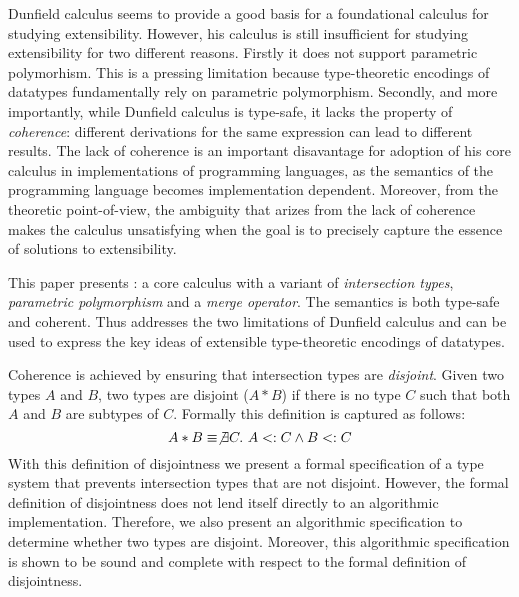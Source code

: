
Dunfield calculus seems to provide a good basis for a foundational
calculus for studying extensibility.  However, his calculus is still
insufficient for studying extensibility for two different reasons.  Firstly it does not
support parametric polymorhism. This is a pressing limitation because
type-theoretic encodings of datatypes fundamentally rely on parametric
polymorphism.  Secondly, and more importantly, while Dunfield calculus
is type-safe, it lacks the property of \emph{coherence}: different
derivations for the same expression can lead to different results. The
lack of coherence is an important disavantage for adoption of his core
calculus in implementations of programming languages, as the semantics
of the programming language becomes implementation dependent.
Moreover, from the theoretic point-of-view, the ambiguity that arizes
from the lack of coherence makes the calculus unsatisfying when the
goal is to precisely capture the essence of solutions to
extensibility.

This paper presents \name: a core calculus with a variant of
\emph{intersection types}, \emph{parametric polymorphism} and a
\emph{merge operator}. The semantics \name is both type-safe and
coherent. Thus \name addresses the two limitations of Dunfield
calculus and can be used to express the key ideas of extensible
type-theoretic encodings of datatypes.

Coherence is achieved by ensuring that intersection types are
\emph{disjoint}. Given two types $A$ and $B$, two types are disjoint
($A * B$)
if there is no type $C$ such that both $A$ and $B$ are
subtypes of $C$. Formally this definition is captured as follows:
\[A * B \equiv \not\exists C.~A <: C \wedge B <: C\]
With this definition of disjointness we present a formal specification
of a type system that prevents intersection types that are not
disjoint.  However, the formal definition of disjointness does
not lend itself directly to an algorithmic implementation. Therefore,
we also present an algorithmic specification to determine whether two
types are disjoint. Moreover, this algorithmic specification is shown to be
sound and complete with respect to the formal definition of
disjointness.

